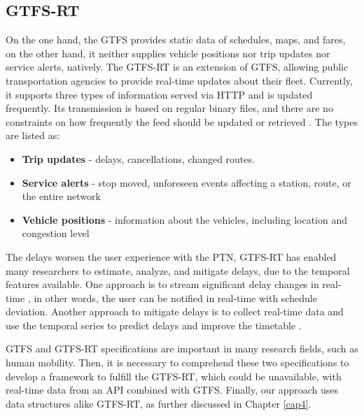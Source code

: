 \subsection{GTFS-RT}
On the one hand, the GTFS provides static data of schedules, maps, and fares, on the other hand, 
it neither supplies vehicle positions nor trip updates nor service alerts, natively. The GTFS-RT
is an extension of GTFS, allowing public transportation agencies to provide 
real-time updates about their fleet. Currently,
it supports three types of information served via HTTP and is updated
frequently. Its transmission is based on regular binary files, and there are no 
constraints on how frequently the feed should be updated or retrieved \cite{GTFS-RT}.
The types are listed as:
\begin{itemize}
  \item \textbf{Trip updates} - delays, cancellations, changed routes.
  \item \textbf{Service alerts} - stop moved, unforeseen events affecting a station, route, or the entire network
  \item \textbf{Vehicle positions} - information about the vehicles, including location and congestion level
\end{itemize}

The delays worsen the user experience with the PTN,
GTFS-RT has enabled many researchers to estimate, analyze, and mitigate delays,
due to the temporal features available.
One approach is to stream significant delay changes in
real-time \cite{GTFS-RT_delays_2022-ADWIN}, 
in other words, the user can be notified in real-time with 
schedule deviation. Another approach to mitigate delays is
to collect real-time data and use the temporal series to
predict delays and improve the timetable
\cite{GTFS-RT_delays_2017, GTFS-RT_delays_2022}.

GTFS and GTFS-RT specifications are important in many research fields, such as human mobility. 
Then, it is necessary to comprehend these two specifications to develop a framework to fulfill the GTFS-RT, which could be unavailable, with real-time data from an API combined with GTFS. Finally, our approach uses data structures alike GTFS-RT, as further discussed in Chapter \ref{cap4}.


